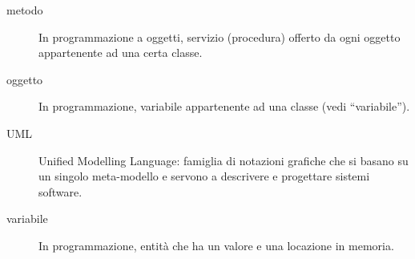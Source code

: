 \begin{description}
	\item[metodo] In programmazione a oggetti, servizio (procedura) offerto da ogni oggetto appartenente ad una certa classe.
	\item[oggetto] In programmazione, variabile appartenente ad una classe (vedi “variabile”).
	\item[UML] Unified Modelling Language: famiglia di notazioni grafiche che si basano su un singolo meta-modello e servono a descrivere e progettare sistemi software.
	\item[variabile] In programmazione, entità che ha un valore e una locazione in memoria.
\end{description}




